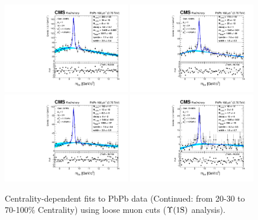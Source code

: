 \begin{figure}
 \includegraphics[width=0.49\textwidth]{Chapters/aYield/PbPb/pt_3p5_4/Centrality/Cent_30_40/PbPb_Cent_30_40_fsr1.pdf}
 \includegraphics[width=0.49\textwidth]{Chapters/aYield/PbPb/pt_3p5_4/Centrality/Cent_40_50/PbPb_Cent_40_50_fsr1.pdf}
  \includegraphics[width=0.49\textwidth]{Chapters/aYield/PbPb/pt_3p5_4/Centrality/Cent_50_70/PbPb_Cent_50_70_fsr1.pdf}
  \includegraphics[width=0.49\textwidth]{Chapters/aYield/PbPb/pt_3p5_4/Centrality/Cent_70_100/PbPb_Cent_70_100_fsr1.pdf}
 \caption{Centrality-dependent fits to PbPb data (Continued:
   from 20-30 to 70-100$\%$ Centrality) using loose muon cuts ($\Upsilon\mathrm{(1S)}$ analysis).}
 \label{fig:YieldsCent1SContd} 
\end{figure}

